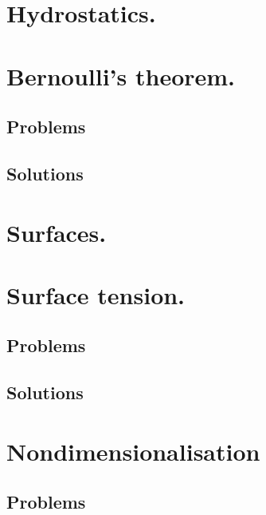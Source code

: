    \chapter{Hydrostatics.}

   \chapter{Bernoulli's theorem.}
      
      \section{Problems}
         
      \section{Solutions}
         \shipoutAnswer

   \chapter{Surfaces.}

   \chapter{Surface tension.}
      \section{Problems}
         
      \section{Solutions}
         \shipoutAnswer

   \chapter{Nondimensionalisation}
      
      
      \section{Problems}
         
